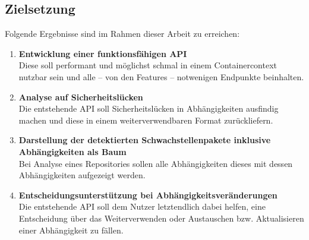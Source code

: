 \subsection{Zielsetzung} \label{sec:Zielsetzung}
    Folgende Ergebnisse sind im Rahmen dieser Arbeit zu erreichen:
    \begin{enumerate}
        \item \textbf{Entwicklung einer funktionsfähigen API} \\
            Diese soll performant und möglichst schmal in einem Containercontext nutzbar sein und alle -- von den Features -- notwenigen Endpunkte beinhalten.
        \item \textbf{Analyse auf Sicherheitslücken} \\
            Die entstehende API soll Sicherheitslücken in Abhängigkeiten ausfindig machen und diese in einem weiterverwendbaren Format zurückliefern.
        \item \textbf{Darstellung der detektierten Schwachstellenpakete inklusive Abhängigkeiten als Baum} \\
            Bei Analyse eines Repositories sollen alle Abhängigkeiten dieses mit dessen Abhängigkeiten aufgezeigt werden.
        \item \textbf{Entscheidungsunterstützung bei Abhängigkeitsveränderungen} \\
            Die entstehende API soll dem Nutzer letztendlich dabei helfen, eine Entscheidung über das Weiterverwenden oder Austauschen bzw. Aktualisieren einer Abhängigkeit zu fällen.
    \end{enumerate}